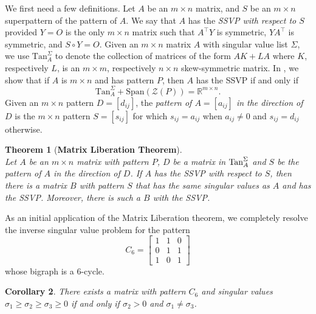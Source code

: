\documentclass[preprint,12pt]{elsarticle}
\newcommand{\trans  }{^\top}
\newtheorem{theorem}{Theorem}[section]
\newtheorem{corollary}[theorem]{Corollary}
\begin{document}
We first need a few definitions. 
Let $A$ be an $m\times n$ matrix, and $S$ be an $m\times n$ superpattern of the pattern of $A$.
We say that $A$ has the {\it SSVP with respect to $S$} provided $Y=O$ is the only $m\times n$ matrix such that 
$A\trans Y$ is symmetric, $YA\trans$
is symmetric, and $S \circ Y=O$. Given an $m\times n$ matrix $A$ 
with singular value list $\Sigma$,
we use 
$\mbox{Tan}^{\Sigma}_A$ to denote the 
collection of matrices of the form 
$AK+LA$ where $K$, respectively $L$,
is an $m\times m$, respectively $n\times n$ skew-symmetric matrix.
In , we show that 
if $A$ is $m\times n$ and  has pattern $P$, then $A$ has the SSVP if and only if 
\[ \mbox{Tan}^{\Sigma}_A+ \mbox{Span}(\mathcal{Z}(P))
= \mathbb{R}^{m\times n}.
\] 
Given an $m\times n$ pattern $D=[d_{ij}] $, the {\it pattern of $A=[a_{ij}] $ in the direction of $D$} is the $m\times n$ 
pattern $S=[s_{ij}]$ for which 
$s_{ij}= a_{ij}$ when $a_{ij} \neq 0$ and $s_{ij}= d_{ij}$
otherwise. 


\begin{theorem}[\bf Matrix Liberation Theorem]
\phantom{ } \\
Let $A$ be an $m\times n$ matrix with pattern $P$,  $D$ be a matrix in $\mbox{\rm Tan}^{\Sigma}_A$ 
and  $S$ be the pattern of $A$ in the direction of $D$.
If $A$ has the SSVP with respect to $S$, then there is a matrix $B$ with pattern 
$S$ that has the same singular values as $A$ and has the SSVP.
Moreover, there is such a $B$ with the SSVP.
\end{theorem}

As an initial application of the Matrix Liberation theorem, we completely resolve the inverse singular value problem for the 
pattern
\[ 
C_6= \left[ 
\begin{array}{ccc}
1 & 1 & 0 \\
0 & 1 & 1 \\
1 & 0 & 1 
\end{array}
\right] 
\]
whose bigraph is a $6$-cycle.



\begin{corollary}
There exists a matrix with pattern $C_6$ and singular values $\sigma_1\geq \sigma_2 \geq \sigma_3 \geq 0$ if and only 
if $\sigma_2>0$ and $\sigma_1 \neq  \sigma_3$.
\end{corollary}
\end{document}
